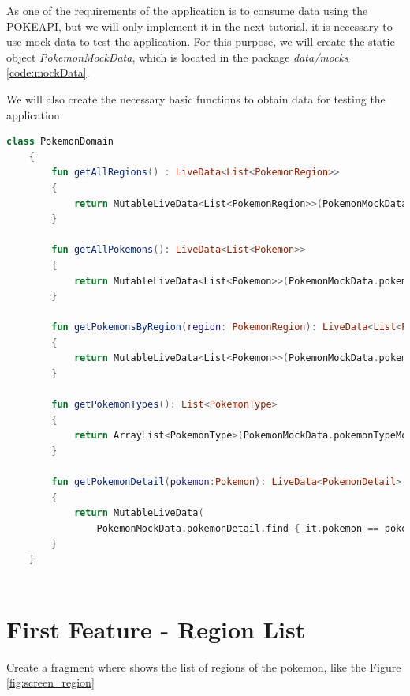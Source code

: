\documentclass[a4paper, 12pt]{article}
\begin{document}
As one of the requirements of the application is to consume data using the POKEAPI, but we will only implement it in the next tutorial, it is necessary to use mock data to test the application. 
For this purpose, we will create the static object \textit{PokemonMockData}, which is located in the package \textit{data/mocks} \ref{code:mockData}.


We will also create the necessary basic functions to obtain data for testing the application.

\begin{lstlisting}[caption={Region Fragment Layout.}, label={code:screen_region_list}, language=Kotlin]
    class PokemonDomain
    {
        fun getAllRegions() : LiveData<List<PokemonRegion>>
        {
            return MutableLiveData<List<PokemonRegion>>(PokemonMockData.regions)
        }
        
        fun getAllPokemons(): LiveData<List<Pokemon>>
        {
            return MutableLiveData<List<Pokemon>>(PokemonMockData.pokemons)
        }
    
        fun getPokemonsByRegion(region: PokemonRegion): LiveData<List<Pokemon>>
        {
            return MutableLiveData<List<Pokemon>>(PokemonMockData.pokemons.filter { it.region == region })
        }
    
        fun getPokemonTypes(): List<PokemonType>
        {
            return ArrayList<PokemonType>(PokemonMockData.pokemonTypeMock)
        }
    
        fun getPokemonDetail(pokemon:Pokemon): LiveData<PokemonDetail>
        {
            return MutableLiveData(
                PokemonMockData.pokemonDetail.find { it.pokemon == pokemon })
        }
    }
    
\end{lstlisting}


\section{First Feature - Region List}

Create a fragment where shows the list of regions of the pokemon, like the Figure \ref{fig:screen_region}
\end{document}
